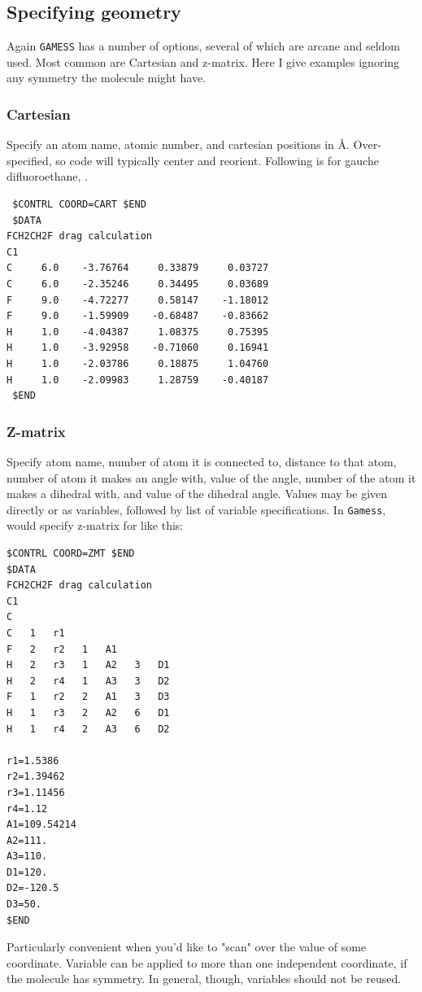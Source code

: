 \documentclass[11pt]{article}
\begin{document}
\subsection{Specifying geometry}
\label{sec-7-4}
Again \texttt{GAMESS} has a number of options, several of which are arcane and seldom used.  Most common are Cartesian and z-matrix.  Here I give examples ignoring any symmetry the molecule might have.
\subsubsection{Cartesian}
\label{sec-7-4-1}
Specify an atom name, atomic number, and cartesian positions in \AA{}.  Over-specified, so code will typically center and reorient.  Following is for gauche difluoroethane, .
\begin{verbatim}
 $CONTRL COORD=CART $END
 $DATA
FCH2CH2F drag calculation
C1
C     6.0    -3.76764     0.33879     0.03727
C     6.0    -2.35246     0.34495     0.03689
F     9.0    -4.72277     0.58147    -1.18012
F     9.0    -1.59909    -0.68487    -0.83662
H     1.0    -4.04387     1.08375     0.75395
H     1.0    -3.92958    -0.71060     0.16941
H     1.0    -2.03786     0.18875     1.04760
H     1.0    -2.09983     1.28759    -0.40187
 $END
\end{verbatim}

\subsubsection{Z-matrix}
\label{sec-7-4-2}
Specify atom name, number of atom it is connected to, distance to that atom, number of atom it makes an angle with, value of the angle, number of the atom it makes a dihedral with, and value of the dihedral angle.  Values may be given directly or as variables, followed by list of variable specifications.  In \texttt{Gamess}, would specify z-matrix for  like this:
\begin{verbatim}
$CONTRL COORD=ZMT $END
$DATA
FCH2CH2F drag calculation
C1
C
C   1   r1
F   2   r2   1   A1
H   2   r3   1   A2   3   D1
H   2   r4   1   A3   3   D2
F   1   r2   2   A1   3   D3
H   1   r3   2   A2   6   D1
H   1   r4   2   A3   6   D2

r1=1.5386
r2=1.39462
r3=1.11456
r4=1.12
A1=109.54214
A2=111.
A3=110.
D1=120.
D2=-120.5
D3=50.
$END
\end{verbatim}
Particularly convenient when you'd like to "scan" over the value of some coordinate.  Variable can be applied to more than one independent coordinate, if the molecule has symmetry.  In general, though, variables should not be reused.
\end{document}
